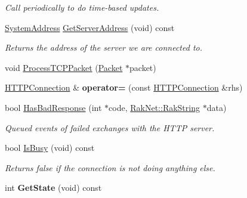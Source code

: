 \begin{DoxyCompactItemize}
\begin{DoxyCompactList}\small\item\em Call periodically to do time-\/based updates. \end{DoxyCompactList}\item 
\hypertarget{class_rak_net_1_1_h_t_t_p_connection_a5bf0b91909e4936e46255089347060fe}{\hyperlink{struct_rak_net_1_1_system_address}{System\-Address} \hyperlink{class_rak_net_1_1_h_t_t_p_connection_a5bf0b91909e4936e46255089347060fe}{Get\-Server\-Address} (void) const }\label{class_rak_net_1_1_h_t_t_p_connection_a5bf0b91909e4936e46255089347060fe}

\begin{DoxyCompactList}\small\item\em Returns the address of the server we are connected to. \end{DoxyCompactList}\item 
void \hyperlink{class_rak_net_1_1_h_t_t_p_connection_a7b1a42b83ba1e8d800f34b3a69ea259a}{Process\-T\-C\-P\-Packet} (\hyperlink{struct_rak_net_1_1_packet}{Packet} $\ast$packet)
\item 
\hypertarget{class_rak_net_1_1_h_t_t_p_connection_a9a37f734680829915bd782dfaea5cda9}{\hyperlink{class_rak_net_1_1_h_t_t_p_connection}{H\-T\-T\-P\-Connection} \& {\bfseries operator=} (const \hyperlink{class_rak_net_1_1_h_t_t_p_connection}{H\-T\-T\-P\-Connection} \&rhs)}\label{class_rak_net_1_1_h_t_t_p_connection_a9a37f734680829915bd782dfaea5cda9}

\item 
\hypertarget{class_rak_net_1_1_h_t_t_p_connection_adf5e4381c2076eb67d753b75dc19f15d}{bool \hyperlink{class_rak_net_1_1_h_t_t_p_connection_adf5e4381c2076eb67d753b75dc19f15d}{Has\-Bad\-Response} (int $\ast$code, \hyperlink{class_rak_net_1_1_rak_string}{Rak\-Net\-::\-Rak\-String} $\ast$data)}\label{class_rak_net_1_1_h_t_t_p_connection_adf5e4381c2076eb67d753b75dc19f15d}

\begin{DoxyCompactList}\small\item\em Queued events of failed exchanges with the H\-T\-T\-P server. \end{DoxyCompactList}\item 
\hypertarget{class_rak_net_1_1_h_t_t_p_connection_a011655483785704a389ad23ca5cbd5e3}{bool \hyperlink{class_rak_net_1_1_h_t_t_p_connection_a011655483785704a389ad23ca5cbd5e3}{Is\-Busy} (void) const }\label{class_rak_net_1_1_h_t_t_p_connection_a011655483785704a389ad23ca5cbd5e3}

\begin{DoxyCompactList}\small\item\em Returns false if the connection is not doing anything else. \end{DoxyCompactList}\item 
\hypertarget{class_rak_net_1_1_h_t_t_p_connection_ab746c28c128b04f5d43288c82be7dbe9}{int {\bfseries Get\-State} (void) const }\label{class_rak_net_1_1_h_t_t_p_connection_ab746c28c128b04f5d43288c82be7dbe9}

\end{DoxyCompactItemize}
